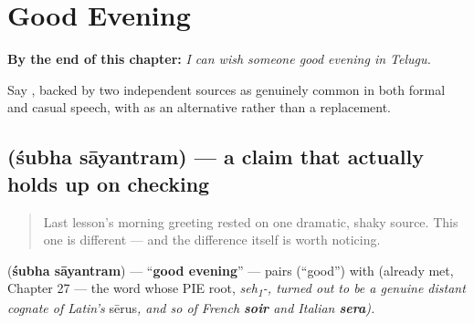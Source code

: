 
\chapter{Good Evening}
\label{ch:te-good-evening}

\begin{chapteropening}
\textbf{By the end of this chapter:} \emph{I can wish someone good evening in Telugu.}

Say  , backed by two independent sources as genuinely common in both formal and casual speech, with  as an alternative rather than a replacement.
\end{chapteropening}

\section[\texorpdfstring{\te{శుభ} \te{సాయంత్రం} (śubha sāyantram)}{శుభ సాయంత్రం (śubha sāyantram)}]{  (śubha sāyantram) — a claim that actually holds up on checking}

\label{lesson:TE-C30-subha-sayantram}



\begin{quote}
Last lesson's morning greeting rested on one dramatic, shaky source. This one is different — and the difference itself is worth noticing.
\end{quote}

\begin{cousinweb}
\textbf{ } (\textbf{śubha sāyantram}) — \textquotedblleft{}\textbf{good evening}\textquotedblright{} — pairs \textbf{} (\textquotedblleft{}good\textquotedblright{}) with \textbf{} (already met, Chapter 27 — the word whose PIE root, \emph{seh\textsubscript{1}-, turned out to be a genuine distant cognate of Latin's }sērus\emph{, and so of French \textbf{soir} and Italian \textbf{sera}).}
\end{cousinweb}

